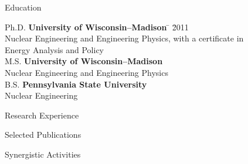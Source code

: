 \documentclass{resume3} %
\begin{document}

\begin{rSection}{Education}

\begin{tabbing}
Ph.D. \hspace*{2 em}\= \textbf{University of Wisconsin--Madison} \hspace*{5em} \= \hspace*{15em} \= 2011 \\
      \> Nuclear Engineering and Engineering Physics, with a certificate in \\ \> Energy Analysis and Policy \\
%
M.S. \hspace*{2 em}\> \textbf{University of Wisconsin--Madison} \>  \\
      \> Nuclear Engineering and Engineering Physics \\
%
B.S. \hspace*{2 em}\> \textbf{Pennsylvania State University} \>  \\
      \> Nuclear Engineering
\end{tabbing}
\end{rSection}

\begin{rSection}{Research Experience}

\end{rSection}

\begin{rSection}{Selected Publications}
%

\end{rSection}

\vspace*{0.5em}
\begin{rSection}{Synergistic Activities}

\end{rSection}
\end{document}
